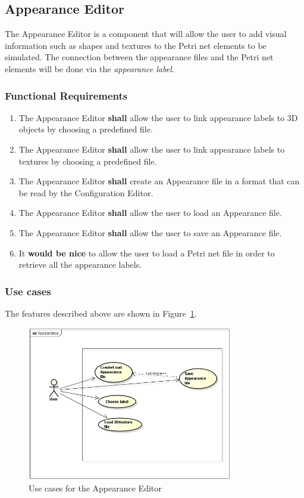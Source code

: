 \subsection{Appearance Editor}
\label{sec:sf-appearance}

The Appearance Editor is a component that will allow the user to add visual information such as shapes and textures to the Petri net elements to be simulated. The connection between the appearance files and the Petri net elements will be done via the \textit{appearance label}. 

\subsubsection{Functional Requirements}

\begin{enumerate}
\item The Appearance Editor \textbf{shall} allow the user to link appearance labels to 3D objects by choosing a predefined file.
\item The Appearance Editor \textbf{shall} allow the user to link appearance labels to textures by choosing a predefined file.
\item The Appearance Editor \textbf{shall} create an Appearance file in a format that can be read by the Configuration Editor.
\item The Appearance Editor \textbf{shall} allow the user to load an Appearance file.
\item The Appearance Editor \textbf{shall} allow the user to save an Appearance file.
\item It \textbf{would be nice} to allow the user to load a Petri net file in order to retrieve all the appearance labels.     
\end{enumerate}

\subsubsection{Use cases}

The features described above are shown in Figure~\ref{fig:use-cases-appearance-editor}.

\begin{figure}[htp]
\begin{center}
  \includegraphics[width=0.8\textwidth]{image/uc-appearance.png}
  \caption{Use cases for the Appearance Editor}
  \label{fig:use-cases-appearance-editor}
\end{center}
\end{figure}

